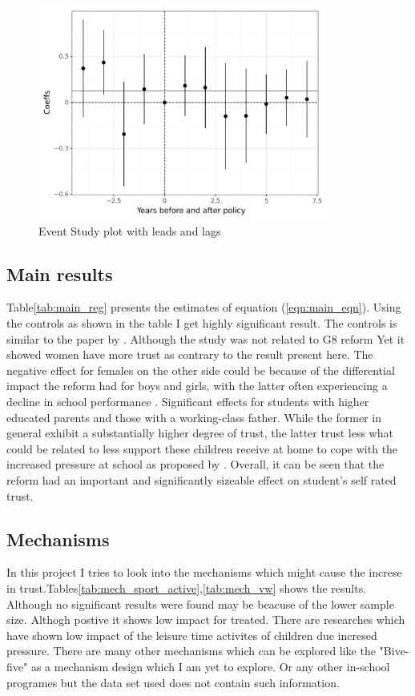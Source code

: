 \documentclass[11pt, a4paper, leqno]{article}
\begin{document}
\begin{figure}[H]
    \centering
    \includegraphics[width=0.85\textwidth]{../bld/python/figures/event_study_gym}
     \caption{Event Study plot with leads and lags}\label{fig:event_study}
\end{figure}

\subsection{Main results}
Table\ref{tab:main_reg} presents the estimates of equation (\ref{eqn:main_eqn}). Using the controls as shown in the table I get highly significant result. The controls is 
similar to the paper by \citep{dohmen2008representative}. Although the study was not related to G8 reform Yet it showed women have more trust as contrary to the result present
here. The negative effect for females on the other side could be because of the differential impact the reform had for boys and girls, with the latter often experiencing a 
decline in school performance \citep{dahmann2017does}. Significant effects for students with higher educated parents and those with a working-class father. While the former 
in general exhibit a substantially higher degree of trust, the latter trust less what could be related to less support these children receive at home to cope with the increased 
pressure at school as proposed by \citet{dahmann2014impact}. Overall, it can be seen that the reform had an important and significantly sizeable effect on student's self rated trust. 

\subsection{Mechanisms}
In this project I tries to look into the mechanisms which might cause the increse in trust.Tables\ref{tab:mech_sport_active},\ref{tab:mech_vw} shows the results. Although no significant 
results were found may be beacuse of the lower sample size. Althogh postive it shows low impact for treated. There are researches which have shown low impact of the leisure time activites 
of children due incresed pressure. There are many other mechanisms which can be explored like the "Bive-five" as a mechanism design which I am yet to explore. Or any other in-school programes
but the data set used does not contain such information. 
\end{document}
